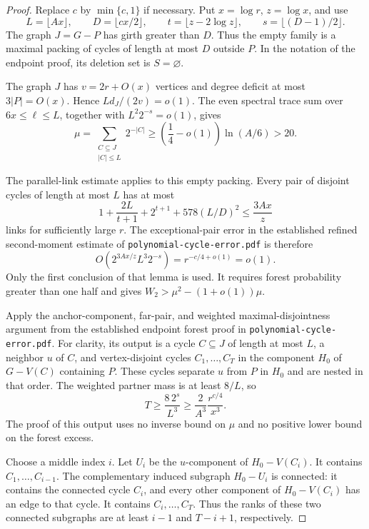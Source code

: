 \begin{proof}
Replace $c$ by $\min\{c,1\}$ if necessary.
Put $x=\log r$, $z=\log x$, and use
\[
 L=\lfloor Ax\rfloor,\qquad
 D=\lfloor cx/2\rfloor,\qquad
 t=\lfloor z-2\log z\rfloor,\qquad
 s=\lfloor(D-1)/2\rfloor.
\]
The graph $J=G-P$ has girth greater than $D$.
Thus the empty family is a maximal packing of cycles of length at most $D$ outside $P$.
In the notation of the endpoint proof, its deletion set is $S=\varnothing$.

The graph $J$ has $v=2r+O(x)$ vertices and degree deficit at most $3|P|=O(x)$.
Hence $Ld_J/(2v)=o(1)$.
The even spectral trace sum over $6x\le\ell\le L$, together with
$L^2 2^{-s}=o(1)$, gives
\[
 \mu=\sum_{\substack{C\subseteq J\\|C|\le L}}2^{-|C|}
 \ge\left(\frac14-o(1)\right)\ln(A/6)>20.
\]

The parallel-link estimate applies to this empty packing.
Every pair of disjoint cycles of length at most $L$ has at most
\[
 1+\frac{2L}{t+1}+2^{t+1}+578(L/D)^2
 \le\frac{3Ax}{z}
\]
links for sufficiently large $r$.
The exceptional-pair error in the established refined second-moment estimate of
\texttt{polynomial-cycle-error.pdf} is therefore
\[
 O\!\left(2^{3Ax/z}L^3 2^{-s}\right)
 =r^{-c/4+o(1)}=o(1).
\]
Only the first conclusion of that lemma is used.
It requires forest probability greater than one half and gives
$W_2>\mu^2-(1+o(1))\mu$.

Apply the anchor-component, far-pair, and weighted maximal-disjointness argument from the established endpoint forest proof in
\texttt{polynomial-cycle-error.pdf}.
For clarity, its output is a cycle $C\subseteq J$ of length at most $L$, a neighbor $u$ of $C$, and vertex-disjoint cycles
$C_1,\ldots,C_T$ in the component $H_0$ of $G-V(C)$ containing $P$.
These cycles separate $u$ from $P$ in $H_0$ and are nested in that order.
The weighted partner mass is at least $8/L$, so
\[
 T\ge\frac{8\,2^s}{L^3}
 \ge\frac{2}{A^3}\frac{r^{c/4}}{x^3}.
\]
The proof of this output uses no inverse bound on $\mu$ and no positive lower bound on the forest excess.

Choose a middle index $i$.
Let $U_i$ be the $u$-component of $H_0-V(C_i)$.
It contains $C_1,\ldots,C_{i-1}$.
The complementary induced subgraph $H_0-U_i$ is connected: it contains the connected cycle $C_i$, and every other component of $H_0-V(C_i)$ has an edge to that cycle.
It contains $C_i,\ldots,C_T$.
Thus the ranks of these two connected subgraphs are at least $i-1$ and $T-i+1$, respectively.


\end{proof}
